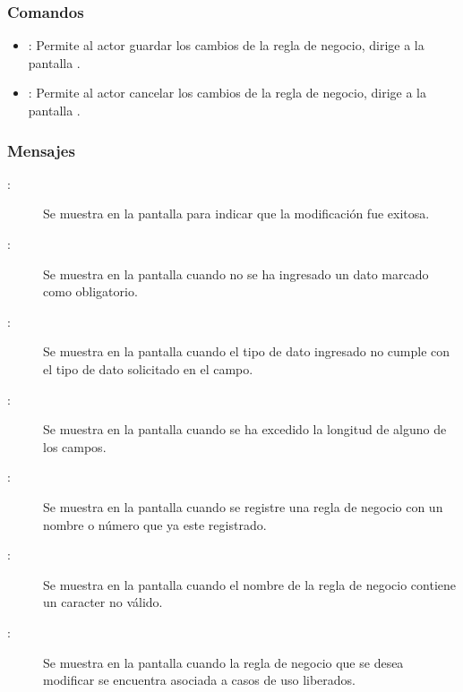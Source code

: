\subsubsection{Comandos}
\begin{itemize}
	\item {}: Permite al actor guardar los cambios de la regla de negocio, dirige a la pantalla .
	\item {}: Permite al actor cancelar los cambios de la regla de negocio, dirige a la pantalla .
\end{itemize}

\subsubsection{Mensajes}
	
\begin{description}
	\item[:] Se muestra en la pantalla  para indicar que la modificación fue exitosa.
	\item[:] Se muestra en la pantalla  cuando no se ha ingresado un dato marcado como obligatorio.
	\item[:] Se muestra en la pantalla  cuando el tipo de dato ingresado no cumple con el tipo de dato solicitado en el campo.
	\item[:] Se muestra en la pantalla  cuando se ha excedido la longitud de alguno de los campos.
	\item[:] Se muestra en la pantalla  cuando se registre una regla de negocio con un nombre o número que ya este registrado.
	\item[:] Se muestra en la pantalla  cuando el nombre de la regla de negocio contiene un caracter no válido.
	\item[:] Se muestra en la pantalla  cuando la regla de negocio que se desea modificar se encuentra asociada a casos de uso liberados.
\end{description}
